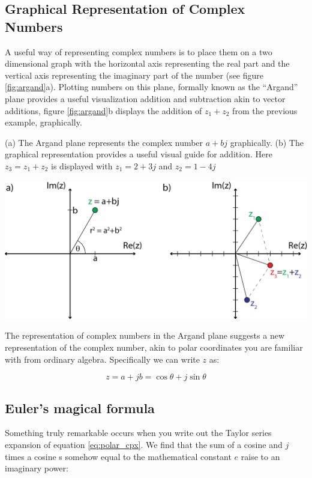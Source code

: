 \documentclass{tufte-book}
\begin{document}
\subsection{Graphical Representation of Complex Numbers}
A useful way of representing complex numbers is to place them on a two dimensional graph with the horizontal axis representing the real part and the vertical axis representing the imaginary part of the number (see figure \ref{fig:argand}a). Plotting numbers on this plane, formally known as the ``Argand'' plane provides a useful visualization addition and subtraction akin to vector additions, figure \ref{fig:argand}b displays the addition of $z_1+z_2$ from the previous example, graphically. 

\begin{marginfigure}
\caption{(a) The Argand plane represents the complex number $a+bj$ graphically. (b) The graphical representation provides a useful visual guide for addition. Here $z_3 = z_1 + z_2$ is displayed with $z_1 = 2+3j$ and $z_2 = 1-4j$}
\label{fig:argand}
\includegraphics[width=\textwidth]{argand.png}
\end{marginfigure}

The representation of complex numbers in the Argand plane suggests a new representation of the complex number, akin to polar coordinates you are familiar with from ordinary algebra. Specifically we can write $z$ as:

\begin{equation}\label{eq:polar_cpx}
z = a+jb = \cos\theta + j\sin\theta
\end{equation}


\subsection{Euler's magical formula}
Something truly remarkable occurs when you write out the Taylor series expansion of equation \ref{eq:polar_cpx}. We find that the sum of a cosine and $j$ times a cosine s somehow equal to the mathematical constant $e$ raise to an imaginary power:
\end{document}
